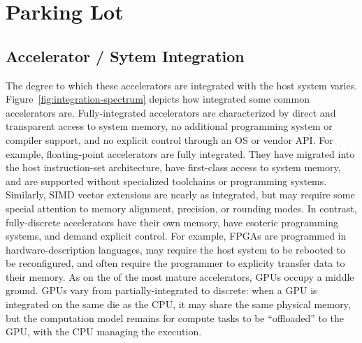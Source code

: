 \chapter{Parking Lot}
\label{ch:lot}

\section{Accelerator / Sytem Integration}

The degree to which these accelerators are integrated with the host system varies.
Figure~\ref{fig:integration-spectrum} depicts how integrated some common accelerators are.
Fully-integrated accelerators are characterized by direct and transparent access to system memory, no additional programming system or compiler support, and no explicit control through an OS or vendor API.
For example, floating-point accelerators are fully integrated.
They have migrated into the host instruction-set architecture, have first-class access to system memory, and are supported without specialized toolchains or programming systems.
Similarly, SIMD vector extensions are nearly as integrated, but may require some special attention to memory alignment, precision, or rounding modes.
In contrast, fully-discrete accelerators have their own memory, have esoteric programming systems, and demand explicit control.
For example, FPGAs are programmed in hardware-description languages, may require the host system to be rebooted to be reconfigured, and often require the programmer to explicity transfer data to their memory.
As on the of the most mature accelerators, GPUs occupy a middle ground.
GPUs vary from partially-integrated to discrete: when a GPU is integrated on the same die as the CPU, it may share the same physical memory, but the computation model remains for compute tasks to be ``offloaded'' to the GPU, with the CPU managing the execution.

